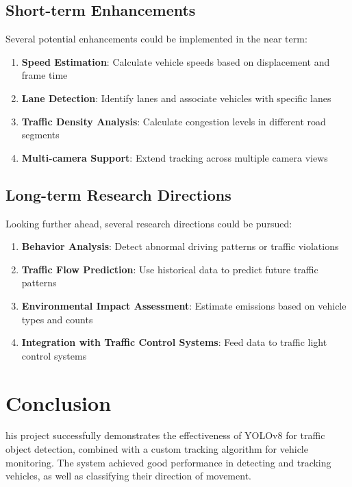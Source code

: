 \documentclass[9pt,a4paper,twoside]{rho-class/rho}
\begin{document}
    \subsection{Short-term Enhancements}
    
    Several potential enhancements could be implemented in the near term:
    
    \begin{enumerate}
        \item \textbf{Speed Estimation}: Calculate vehicle speeds based on displacement and frame time
        \item \textbf{Lane Detection}: Identify lanes and associate vehicles with specific lanes
        \item \textbf{Traffic Density Analysis}: Calculate congestion levels in different road segments
        \item \textbf{Multi-camera Support}: Extend tracking across multiple camera views
    \end{enumerate}
    
    \subsection{Long-term Research Directions}
    
    Looking further ahead, several research directions could be pursued:
    
    \begin{enumerate}
        \item \textbf{Behavior Analysis}: Detect abnormal driving patterns or traffic violations
        \item \textbf{Traffic Flow Prediction}: Use historical data to predict future traffic patterns
        \item \textbf{Environmental Impact Assessment}: Estimate emissions based on vehicle types and counts
        \item \textbf{Integration with Traffic Control Systems}: Feed data to traffic light control systems
    \end{enumerate}

\section{Conclusion}

    his project successfully demonstrates the effectiveness of YOLOv8 for traffic object detection, combined with a custom tracking algorithm for vehicle monitoring. The system achieved good performance in detecting and tracking vehicles, as well as classifying their direction of movement.
    
\end{document}
